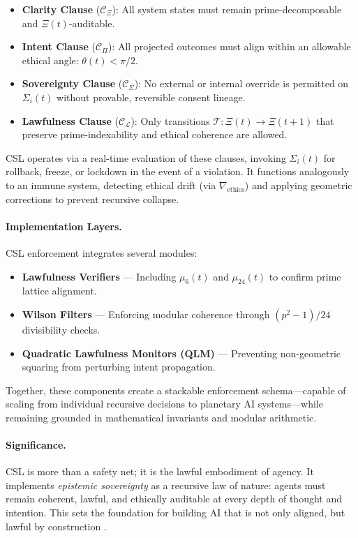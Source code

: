 \documentclass[12pt]{article}
\begin{document}
\begin{itemize}
  \item \textbf{Clarity Clause} ($\mathcal{C}_\Xi$): All system states must remain prime-decomposable and $\Xi(t)$-auditable.
  \item \textbf{Intent Clause} ($\mathcal{C}_\Pi$): All projected outcomes must align within an allowable ethical angle: $\theta(t) < \pi/2$.
  \item \textbf{Sovereignty Clause} ($\mathcal{C}_\Sigma$): No external or internal override is permitted on $\Sigma_i(t)$ without provable, reversible consent lineage.
  \item \textbf{Lawfulness Clause} ($\mathcal{C}_\mathcal{L}$): Only transitions $\mathcal{T}: \Xi(t) \rightarrow \Xi(t+1)$ that preserve prime-indexability and ethical coherence are allowed.
\end{itemize}

CSL operates via a real-time evaluation of these clauses, invoking $\Sigma_i(t)$ for rollback, freeze, or lockdown in the event of a violation. It functions analogously to an immune system, detecting ethical drift (via $\nabla_{\text{ethics}}$) and applying geometric corrections to prevent recursive collapse.

\paragraph{Implementation Layers.}
CSL enforcement integrates several modules:

\begin{itemize}
  \item \textbf{Lawfulness Verifiers} — Including $\mu_6(t)$ and $\mu_{24}(t)$ to confirm prime lattice alignment.
  \item \textbf{Wilson Filters} — Enforcing modular coherence through $(p^2 - 1)/24$ divisibility checks.
  \item \textbf{Quadratic Lawfulness Monitors (QLM)} — Preventing non-geometric squaring from perturbing intent propagation.
\end{itemize}

Together, these components create a stackable enforcement schema—capable of scaling from individual recursive decisions to planetary AI systems—while remaining grounded in mathematical invariants and modular arithmetic.

\paragraph{Significance.}
CSL is more than a safety net; it is the lawful embodiment of agency. It implements \textit{epistemic sovereignty} as a recursive law of nature: agents must remain coherent, lawful, and ethically auditable at every depth of thought and intention. This sets the foundation for building AI that is not only aligned, but lawful by construction \cite{amodei2016concrete, gabriel2020artificial}.
\end{document}
